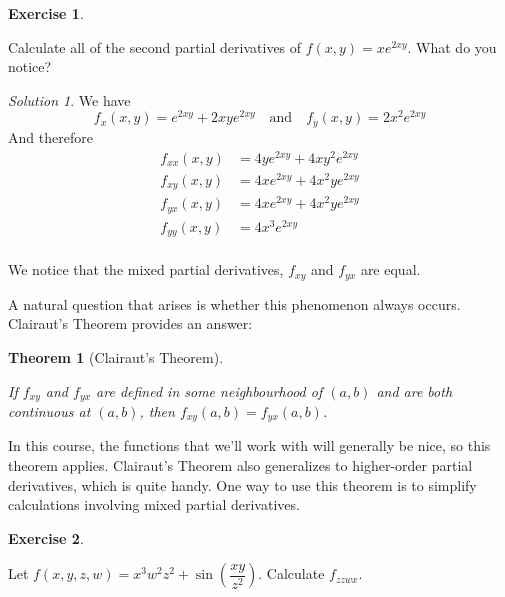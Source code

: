 \documentclass[
]{book}
\newtheorem{theorem}{Theorem}[chapter]
\theoremstyle{definition}
\theoremstyle{definition}
\theoremstyle{definition}
\newtheorem{exercise}{Exercise}[chapter]
\theoremstyle{definition}
\theoremstyle{remark}
\newtheorem*{solution}{Solution}
\begin{document}
\begin{exercise}
\protect\hypertarget{exr:unlabeled-div-17}{}\label{exr:unlabeled-div-17}

Calculate all of the second partial derivatives of \(f(x,y)=xe^{2xy}\). What do you notice?

\end{exercise}

\begin{solution}

We have \[ f_x(x,y)=e^{2xy}+2xye^{2xy} \quad \mbox{and} \quad f_y(x,y)=2x^2e^{2xy}\]
And therefore
\begin{align*}
        f_{xx}(x,y)&=4ye^{2xy}+4xy^2e^{2xy}\\
        f_{xy}(x,y)&=4xe^{2xy}+4x^2ye^{2xy}\\
        f_{yx}(x,y)&=4xe^{2xy}+4x^2ye^{2xy}\\
        f_{yy}(x,y)&=4x^3e^{2xy}\\
    \end{align*}

We notice that the mixed partial derivatives, \(f_{xy}\) and \(f_{yx}\) are equal.

\end{solution}

A natural question that arises is whether this phenomenon always occurs. Clairaut's Theorem provides an answer:

\begin{theorem}[Clairaut's Theorem]
\protect\hypertarget{thm:unlabeled-div-19}{}\label{thm:unlabeled-div-19}

If \(f_{xy}\) and \(f_{yx}\) are defined in some neighbourhood of \((a,b)\) and are both continuous at \((a,b)\), then \(f_{xy}(a,b)=f_{yx}(a,b)\).

\end{theorem}

In this course, the functions that we'll work with will generally be nice, so this theorem applies. Clairaut's Theorem also generalizes to higher-order partial derivatives, which is quite handy. One way to use this theorem is to simplify calculations involving mixed partial derivatives.

\begin{exercise}
\protect\hypertarget{exr:unlabeled-div-20}{}\label{exr:unlabeled-div-20}

Let \(f(x,y,z,w)=x^3w^2z^2+\sin\left(\dfrac{xy}{z^2} \right)\). Calculate \(f_{zzwx}\).

\end{exercise}
\end{document}
